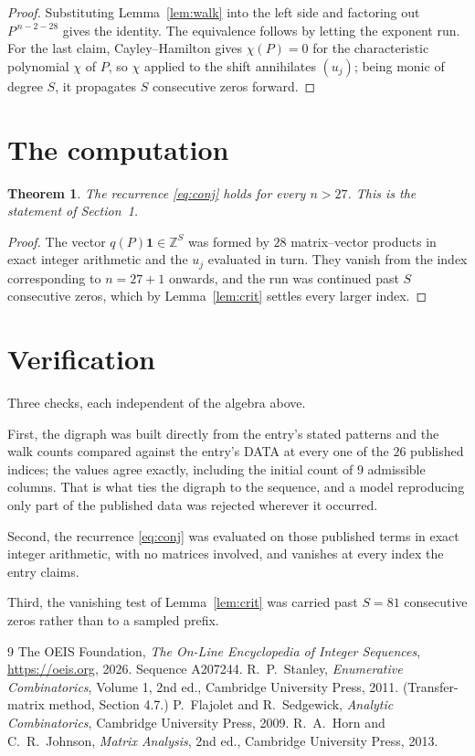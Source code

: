 \documentclass[11pt,a4paper]{article}
\theoremstyle{plain}
\newtheorem{theorem}{Theorem}
\theoremstyle{definition}
\begin{document}
\begin{proof}
Substituting Lemma~\ref{lem:walk} into the left side and factoring out
$P^{\,n-2-28}$ gives the identity. The equivalence follows by letting the exponent
run. For the last claim, Cayley--Hamilton gives $\chi(P)=0$ for the characteristic
polynomial $\chi$ of $P$, so $\chi$ applied to the shift annihilates $(u_j)$; being monic of
degree $S$, it propagates $S$ consecutive zeros forward.
\end{proof}

\section{The computation}

\begin{theorem}
The recurrence \eqref{eq:conj} holds for every $n>27$. This is the statement of
Section~1.
\end{theorem}

\begin{proof}
The vector $q(P)\mathbf{1}\in\mathbb{Z}^{S}$ was formed by $28$ matrix--vector
products in exact integer arithmetic and the $u_j$ evaluated in turn. They vanish from the
index corresponding to $n=27+1$ onwards, and the run was continued past $S$ consecutive
zeros, which by Lemma~\ref{lem:crit} settles every larger index.
\end{proof}

\section{Verification}

Three checks, each independent of the algebra above.

First, the digraph was built directly from the entry's stated patterns and the walk counts
compared against the entry's DATA at every one of the $26$ published indices; the
values agree exactly, including the initial count of $9$ admissible columns. That is
what ties the digraph to the sequence, and a model reproducing only part of the published
data was rejected wherever it occurred.

Second, the recurrence \eqref{eq:conj} was evaluated on those published terms in exact
integer arithmetic, with no matrices involved, and vanishes at every index the entry claims.

Third, the vanishing test of Lemma~\ref{lem:crit} was carried past $S=81$ consecutive
zeros rather than to a sampled prefix.

\begin{thebibliography}{9}
 The OEIS Foundation, \emph{The On-Line Encyclopedia of Integer
Sequences}, \url{https://oeis.org}, 2026. Sequence A207244.
 R.~P.~Stanley, \emph{Enumerative Combinatorics}, Volume 1, 2nd ed.,
Cambridge University Press, 2011. (Transfer-matrix method, Section 4.7.)
 P.~Flajolet and R.~Sedgewick, \emph{Analytic Combinatorics}, Cambridge
University Press, 2009.
 R.~A.~Horn and C.~R.~Johnson, \emph{Matrix Analysis}, 2nd ed., Cambridge
University Press, 2013.
\end{thebibliography}
\end{document}
